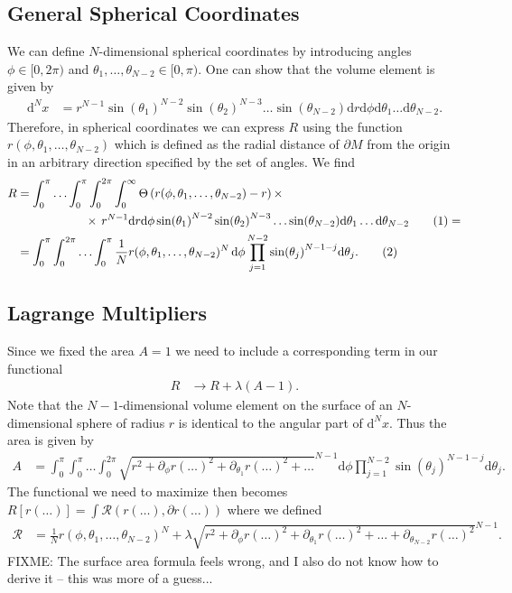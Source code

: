 \documentclass[english, parskip=full]{scrartcl}
\newcommand\numberthis{\addtocounter{equation}{1}\tag{\theequation}}
\newcommand{\intx}{}
\newcommand{\kla}{}
\newcommand{\tecxt}{}
\begin{document}
\subsection{General Spherical Coordinates}
We can define $N$-dimensional spherical coordinates by introducing angles $\phi\in [0,2\pi)$ and $\theta_1,\dots,\theta_{N-2} \in [0,\pi)$.
One can show that the volume element is given by
\begin{align}
\mathrm{d}^Nx &= r^{N-1} \sin(\theta_1)^{N-2} \sin(\theta_2)^{N-3} \dots \sin(\theta_{N-2}) \mathrm{d}r \mathrm{d}\phi \tecxt\text{d}\theta_1 \dots \tecxt\text{d}\theta_{N-2}.
\end{align}
Therefore, in spherical coordinates we can express $R$ using the function $r(\phi,\theta_1,\dots,\theta_{N-2})$ which is defined as the radial distance of $\partial M$ from the origin in an arbitrary direction specified by the set of angles.
We find
\begin{align*}
R &= \intx\int_{0}^{\pi} \dots \intx\int_{0}^{\pi} \intx\int_{0}^{2\pi}  \intx\int_{0}^{\infty} \Theta\kla\left( r(\phi,\theta_1,\dots,\theta_{N-2}) - r \right) \times\\
&\hspace{2cm} \times \, r^{N-1}\mathrm{d}r \mathrm{d}\phi \sin(\theta_1)^{N-2} \sin(\theta_2)^{N-3} \dots \sin(\theta_{N-2}) \tecxt\text{d}\theta_1 \dots \tecxt\text{d}\theta_{N-2} \numberthis = \\
&=  \int_{0}^{\pi} \intx\int_{0}^{2\pi} \dots \intx\int_{0}^{\pi} \frac{1}{N} r(\phi,\theta_1,\dots,\theta_{N-2})^N \, \mathrm{d}\phi \prod_{j=1}^{N-2} \sin(\theta_j)^{N-1-j} \mathrm{d}\theta_j. \numberthis
\end{align*}
\subsection{Lagrange Multipliers}
Since we fixed the area $A=1$ we need to include a corresponding term in our functional
\begin{align}
R &\rightarrow R + \lambda (A - 1).
\end{align}
Note that the $N-1$-dimensional volume element on the surface of an $N$-dimensional sphere of radius $r$ is identical to the angular part of $\tecxt\text{d}^Nx$.
Thus the area is given by
\begin{align}
A &= \int_{0}^{\pi} \intx\int_{0}^{\pi} \dots \intx\int_{0}^{2\pi} \sqrt{r^2 + \partial_\phi r(\dots)^2 + \partial_{\theta_1} r(\dots)^2 + \dots}^{N-1}  \mathrm{d}\phi \prod_{j=1}^{N-2} \sin(\theta_j)^{N-1-j} \mathrm{d}\theta_j.
\end{align}
The functional we need to maximize then becomes $R[r(\dots)] = \int \mathcal{R}(r(\dots), \partial r(\dots))$ where we defined
\begin{align}
\mathcal{R} &= \frac{1}{N} r(\phi,\theta_1 ,\dots,\theta_{N-2})^N + \lambda \sqrt{r^2 + \partial_\phi r(\dots)^2 + \partial_{\theta_1}r(\dots)^2 + \dots + \partial_{\theta_{N-2}} r(\dots)^2}^{N-1}.
\end{align}
FIXME: The surface area formula feels wrong, and I also do not know how to derive it -- this was more of a guess...
\end{document}
